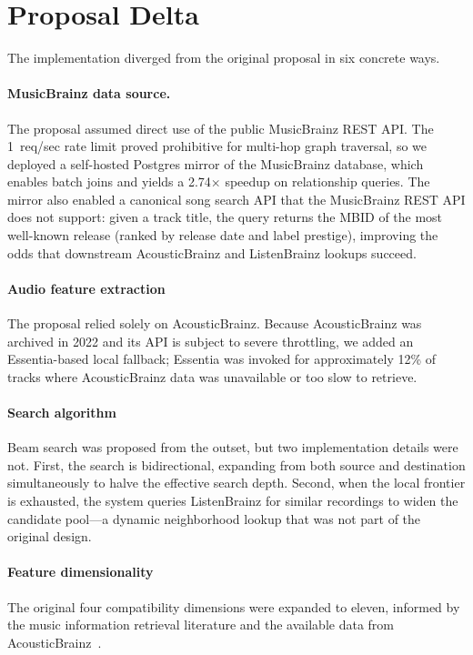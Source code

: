 \section{Proposal Delta}

The implementation diverged from the original proposal in six concrete ways.

\paragraph{MusicBrainz data source.} The proposal assumed direct use of the public MusicBrainz REST API. The 1~req/sec rate limit proved prohibitive for multi-hop graph traversal, so we deployed a self-hosted Postgres mirror of the MusicBrainz database, which enables batch joins and yields a 2.74$\times$ speedup on relationship queries. The mirror also enabled a canonical song search API that the MusicBrainz REST API does not support: given a track title, the query returns the MBID of the most well-known release (ranked by release date and label prestige), improving the odds that downstream AcousticBrainz and ListenBrainz lookups succeed.

\paragraph{Audio feature extraction} The proposal relied solely on AcousticBrainz. Because AcousticBrainz was archived in 2022 and its API is subject to severe throttling, we added an Essentia-based local fallback; Essentia was invoked for approximately 12\% of tracks where AcousticBrainz data was unavailable or too slow to retrieve.

\paragraph{Search algorithm} Beam search was proposed from the outset, but two implementation details were not. First, the search is bidirectional, expanding from both source and destination simultaneously to halve the effective search depth. Second, when the local frontier is exhausted, the system queries ListenBrainz for similar recordings to widen the candidate pool---a dynamic neighborhood lookup that was not part of the original design.

\paragraph{Feature dimensionality} The original four compatibility dimensions were expanded to eleven, informed by the music information retrieval literature and the available data from AcousticBrainz~\cite{knees2013,korzeniowski2021,schweiger2025}.

